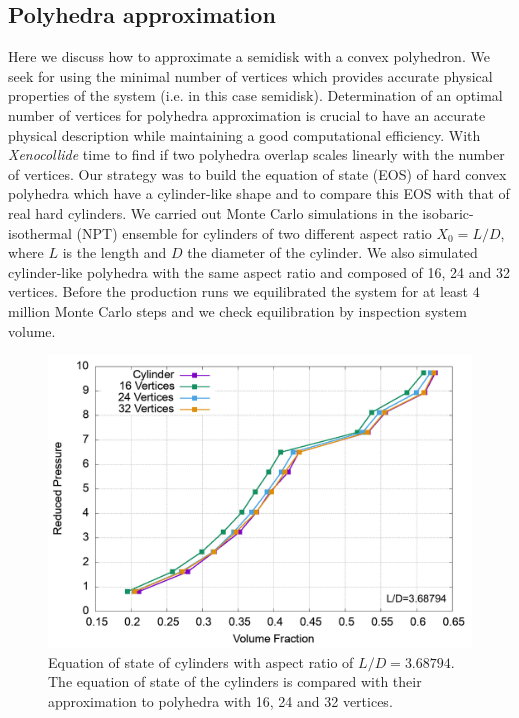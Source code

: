 \documentclass[aip,jcp, amsmath, amssymb, reprint]{revtex4-1}
\begin{document}
\subsection{Polyhedra approximation}
Here we discuss how to approximate a semidisk with a convex polyhedron. We seek for using the minimal number of vertices
which provides accurate physical properties of the system (i.e. in this case semidisk).
Determination of an optimal number of vertices for polyhedra approximation is crucial to have an accurate physical
description while maintaining a good computational efficiency.
With \textit{Xenocollide} time to find if two polyhedra overlap scales linearly with the number of vertices.
Our strategy was to build the equation of state (EOS) of hard convex polyhedra which have a cylinder-like shape and to 
compare this EOS with that of real hard cylinders.
We carried out Monte Carlo simulations in the isobaric-isothermal (NPT) ensemble for
cylinders of two different aspect ratio $X_0=L/D$, where $L$ is the length and $D$ the diameter of the cylinder. 
We also simulated cylinder-like polyhedra with the same aspect ratio and composed of 16, 24 and 32 vertices.
Before the production runs we equilibrated the system for at least $4$ million Monte Carlo steps and we check 
equilibration by inspection system volume.
\begin{figure}[h!] \includegraphics[width=0.9\linewidth]{cylapprox.png}
  \caption{\label{fig:cylapprox} Equation of state of cylinders with aspect ratio of $L/D=3.68794$. The equation of
  state of the cylinders is compared with their approximation to polyhedra with 16, 24 and 32 vertices.}
\end{figure}
\end{document}
